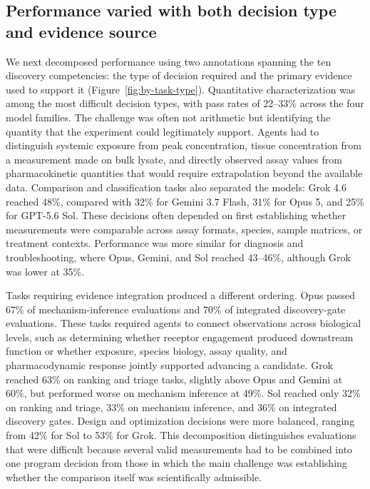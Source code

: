 \documentclass[10pt,letterpaper]{article}
\begin{document}
\subsection{Performance varied with both decision type and evidence source}
We next decomposed performance using two annotations spanning the ten discovery competencies: the type of decision required and the primary evidence used to support it (Figure~\ref{fig:by-task-type}). Quantitative characterization was among the most difficult decision types, with pass rates of 22–33\% across the four model families. The challenge was often not arithmetic but identifying the quantity that the experiment could legitimately support. Agents had to distinguish systemic exposure from peak concentration, tissue concentration from a measurement made on bulk lysate, and directly observed assay values from pharmacokinetic quantities that would require extrapolation beyond the available data. Comparison and classification tasks also separated the models: Grok 4.6 reached 48\%, compared with 32\% for Gemini 3.7 Flash, 31\% for Opus 5, and 25\% for GPT-5.6 Sol. These decisions often depended on first establishing whether measurements were comparable across assay formats, species, sample matrices, or treatment contexts. Performance was more similar for diagnosis and troubleshooting, where Opus, Gemini, and Sol reached 43–46\%, although Grok was lower at 35\%.
\par
Tasks requiring evidence integration produced a different ordering. Opus passed 67\% of mechanism-inference evaluations and 70\% of integrated discovery-gate evaluations. These tasks required agents to connect observations across biological levels, such as determining whether receptor engagement produced downstream function or whether exposure, species biology, assay quality, and pharmacodynamic response jointly supported advancing a candidate. Grok reached 63\% on ranking and triage tasks, slightly above Opus and Gemini at 60\%, but performed worse on mechanism inference at 49\%. Sol reached only 32\% on ranking and triage, 33\% on mechanism inference, and 36\% on integrated discovery gates. Design and optimization decisions were more balanced, ranging from 42\% for Sol to 53\% for Grok. This decomposition distinguishes evaluations that were difficult because several valid measurements had to be combined into one program decision from those in which the main challenge was establishing whether the comparison itself was scientifically admissible.
\par
\end{document}
